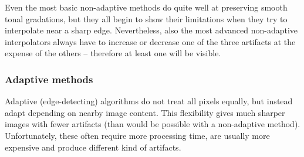 \documentclass[]{usiinfbachelorproject}
\begin{document}
\noindent Even the most basic non-adaptive methods do quite well at preserving smooth tonal gradations, but they all begin to show their limitations when they try to interpolate near a sharp edge. Nevertheless, also the most advanced non-adaptive interpolators always have to increase or decrease one of the three artifacts at the expense of the others -- therefore at least one will be visible.

\subsubsection{Adaptive methods}

Adaptive (edge-detecting) algorithms do not treat all pixels equally, but instead adapt depending on nearby image content. This flexibility gives much sharper images with fewer artifacts (than would be possible with a non-adaptive method). Unfortunately, these often require more processing time, are usually more expensive and produce different kind of artifacts.\\
\end{document}
